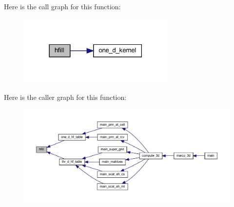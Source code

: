 Here is the call graph for this function\+:
\nopagebreak
\begin{figure}[H]
\begin{center}
\leavevmode
\includegraphics[width=222pt]{Marco_8f90_a480d736c8998d27f049a30b17c5abb11_cgraph}
\end{center}
\end{figure}
Here is the caller graph for this function\+:
\nopagebreak
\begin{figure}[H]
\begin{center}
\leavevmode
\includegraphics[width=350pt]{Marco_8f90_a480d736c8998d27f049a30b17c5abb11_icgraph}
\end{center}
\end{figure}
\mbox{\label{Marco_8f90_afdb11dbe2b5041f4f314349b7334b974}} 
